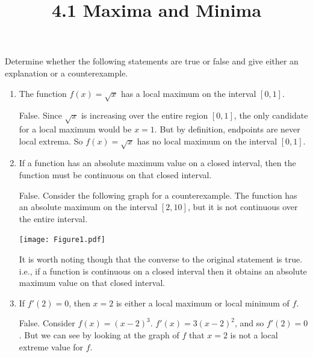 \documentclass[nooutcomes]{ximera}
\title{4.1 Maxima and Minima}
\begin{document}
\begin{abstract}		\end{abstract}
\maketitle

\begin{problem}
Determine whether the following statements are true or false and give either an explanation or a counterexample.

	\begin{enumerate}
	
	\item  The function $f(x) = \sqrt{x}$ has a local maximum on the interval $[0,1]$.
		\begin{freeResponse}
		False.  Since $\sqrt{x}$ is increasing over the entire region $[0,1]$, the only candidate for a local maximum would be $x=1$.  But by definition, endpoints are never local extrema.  So $f(x) = \sqrt{x}$ has no local maximum on the interval $[0,1]$.
		\end{freeResponse}	
		
		
		
	\item  If a function has an absolute maximum value on a closed interval, then the function must be continuous on that closed interval.  
		\begin{freeResponse}
		False.  Consider the following graph for a counterexample.  The function has an absolute maximum on the interval $[2,10]$, but it is not continuous over the entire interval.
		
		\begin{image}
		\texttt{[image: Figure1.pdf]}
		\end{image}
		
		It is worth noting though that the converse to the original statement is true.  i.e., if a function is continuous on a closed interval then it obtains an absolute maximum value on that closed interval.

		\end{freeResponse}	
		
		
		
	\item  If $f'(2)=0$, then $x=2$ is either a local maximum or local minimum of $f$.
		\begin{freeResponse}
		False.  Consider $f(x) = (x-2)^3$.  $f'(x) = 3(x-2)^2$, and so $f'(2) = 0$.  But we can see by looking at the graph of $f$ that $x=2$ is not a local extreme value for $f$.
		

\end{freeResponse}
\end{enumerate}
\end{problem}
\end{document}
